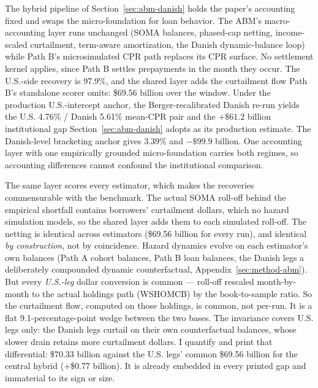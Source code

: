 \documentclass[12pt]{article}
\begin{document}
The hybrid pipeline of Section~\ref{sec:abm-danish} holds the paper's accounting fixed and swaps the micro-foundation for loan behavior. The ABM's macro-accounting layer runs unchanged (SOMA balances, phased-cap netting, income-scaled curtailment, term-aware amortization, the Danish dynamic-balance loop) while Path B's microsimulated CPR path replaces its CPR surface. No settlement kernel applies, since Path B settles prepayments in the month they occur. The U.S.-side recovery is 97.9\%, and the shared layer adds the curtailment flow Path B's standalone scorer omits: \$69.56 billion over the window. Under the production U.S.-intercept anchor, the Berger-recalibrated Danish re-run yields the U.S. 4.76\% / Danish 5.61\% mean-CPR pair and the $+\$61.2$ billion institutional gap Section~\ref{sec:abm-danish} adopts as its production estimate. The Danish-level bracketing anchor gives 3.39\% and $-\$99.9$ billion. One accounting layer with one empirically grounded micro-foundation carries both regimes, so accounting differences cannot confound the institutional comparison.

The same layer scores every estimator, which makes the recoveries commensurable with the benchmark. The actual SOMA roll-off behind the empirical shortfall contains borrowers' curtailment dollars, which no hazard simulation models, so the shared layer adds them to each simulated roll-off. The netting is identical across estimators (\$69.56 billion for every run), and identical \emph{by construction}, not by coincidence. Hazard dynamics evolve on each estimator's own balances (Path A cohort balances, Path B loan balances, the Danish legs a deliberately compounded dynamic counterfactual, Appendix~\ref{sec:method-abm}). But every \emph{U.S.-leg} dollar conversion is common --- roll-off rescaled month-by-month to the actual holdings path (WSHOMCB) by the book-to-sample ratio. So the curtailment flow, computed on those holdings, is common, not per-run. It is a flat 9.1-percentage-point wedge between the two bases. The invariance covers U.S. legs only: the Danish legs curtail on their own counterfactual balances, whose slower drain retains more curtailment dollars. I quantify and print that differential: \$70.33 billion against the U.S. legs' common \$69.56 billion for the central hybrid (+\$0.77 billion). It is already embedded in every printed gap and immaterial to its sign or size.
\end{document}
